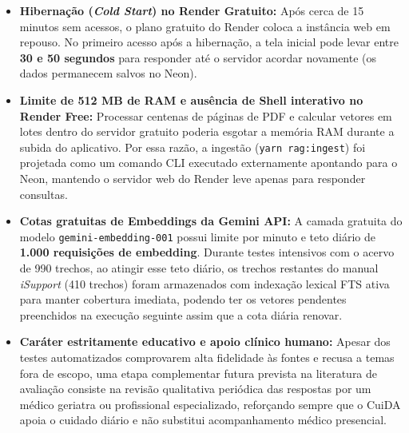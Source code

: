 \documentclass[11pt,a4paper]{article}
\begin{document}
\begin{itemize}[leftmargin=1.25cm, label=\textbullet, topsep=2pt, itemsep=6pt]
  \item \textbf{Hibernação (\textit{Cold Start}) no Render Gratuito:} Após cerca de 15 minutos sem acessos, o plano gratuito do Render coloca a instância web em repouso. No primeiro acesso após a hibernação, a tela inicial pode levar entre \textbf{30 e 50 segundos} para responder até o servidor acordar novamente (os dados permanecem salvos no Neon).
  \item \textbf{Limite de 512 MB de RAM e ausência de Shell interativo no Render Free:} Processar centenas de páginas de PDF e calcular vetores em lotes dentro do servidor gratuito poderia esgotar a memória RAM durante a subida do aplicativo. Por essa razão, a ingestão (\texttt{yarn rag:ingest}) foi projetada como um comando CLI executado externamente apontando para o Neon, mantendo o servidor web do Render leve apenas para responder consultas.
  \item \textbf{Cotas gratuitas de Embeddings da Gemini API:} A camada gratuita do modelo \texttt{gemini-embedding-001} possui limite por minuto e teto diário de \textbf{1.000 requisições de embedding}. Durante testes intensivos com o acervo de 990 trechos, ao atingir esse teto diário, os trechos restantes do manual \textit{iSupport} (410 trechos) foram armazenados com indexação lexical FTS ativa para manter cobertura imediata, podendo ter os vetores pendentes preenchidos na execução seguinte assim que a cota diária renovar.
  \item \textbf{Caráter estritamente educativo e apoio clínico humano:} Apesar dos testes automatizados comprovarem alta fidelidade às fontes e recusa a temas fora de escopo, uma etapa complementar futura prevista na literatura de avaliação consiste na revisão qualitativa periódica das respostas por um médico geriatra ou profissional especializado, reforçando sempre que o CuiDA apoia o cuidado diário e não substitui acompanhamento médico presencial.
\end{itemize}
\end{document}
